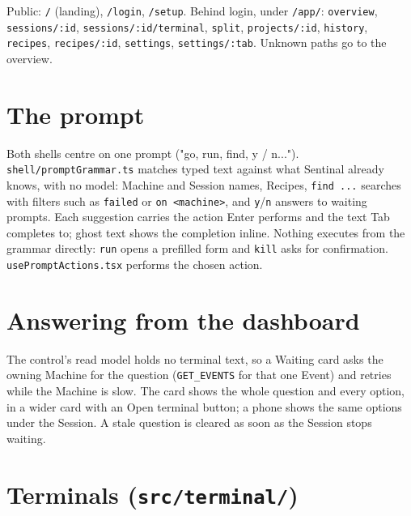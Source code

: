 Public: \texttt{/\allowbreak{}} (landing), \texttt{/\allowbreak{}login}, \texttt{/\allowbreak{}setup}. Behind login, under \texttt{/\allowbreak{}app/\allowbreak{}}: \texttt{overview}, \texttt{sessions/\allowbreak{}:\allowbreak{}id}, \texttt{sessions/\allowbreak{}:\allowbreak{}id/\allowbreak{}terminal}, \texttt{split}, \texttt{projects/\allowbreak{}:\allowbreak{}id}, \texttt{history}, \texttt{recipes}, \texttt{recipes/\allowbreak{}:\allowbreak{}id}, \texttt{settings}, \texttt{settings/\allowbreak{}:\allowbreak{}tab}. Unknown paths go to the overview.

\section{\texorpdfstring{The prompt}{The prompt}}

Both shells centre on one prompt ("go, run, find, y / n..."). \texttt{shell/\allowbreak{}promptGrammar.\allowbreak{}ts} matches typed text against what Sentinal already knows, with no model: Machine and Session names, Recipes, \texttt{find\ .\allowbreak{}.\allowbreak{}.\allowbreak{}} searches with filters such as \texttt{failed} or \texttt{on\ \textless{}machine\textgreater{}}, and \texttt{y}/\texttt{n} answers to waiting prompts. Each suggestion carries the action Enter performs and the text Tab completes to; ghost text shows the completion inline. Nothing executes from the grammar directly: \texttt{run} opens a prefilled form and \texttt{kill} asks for confirmation. \texttt{usePromptActions.\allowbreak{}tsx} performs the chosen action.

\section{Answering from the dashboard}

The control's read model holds no terminal text, so a Waiting card asks the owning Machine for the question (\texttt{GET\_\allowbreak{}EVENTS} for that one Event) and retries while the Machine is slow. The card shows the whole question and every option, in a wider card with an Open terminal button; a phone shows the same options under the Session. A stale question is cleared as soon as the Session stops waiting.

\section{\texorpdfstring{Terminals (\texttt{src/\allowbreak{}terminal/\allowbreak{}})}{Terminals (src/terminal/)}}

